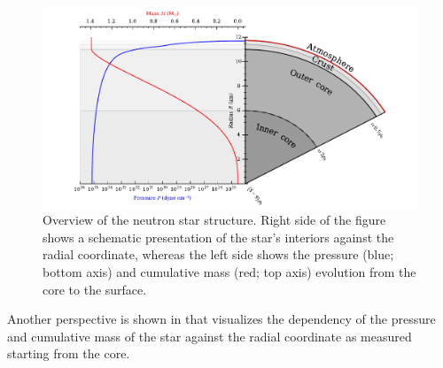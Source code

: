 \begin{figure}
\centering
\includegraphics[width=17cm]{figs/slice/slice.pdf}
\caption{\label{fig:slice}
Overview of the neutron star structure.
Right side of the figure shows a schematic presentation of the star's interiors against the radial coordinate, whereas the left side shows the pressure (blue; bottom axis) and cumulative mass (red; top axis) evolution from the core to the surface.
}
\end{figure}



Another perspective is shown in  that visualizes the dependency of the pressure and cumulative mass of the star against the radial coordinate as measured starting from the core.





